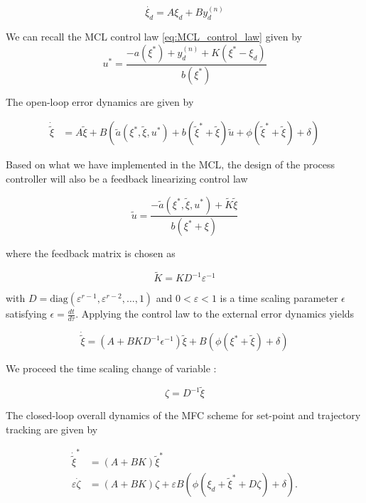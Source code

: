 \begin{equation}
    \dot{\xi_d} = A\xi_d + By_d^{(n)}
\end{equation}

We can recall the MCL control law \ref{eq:MCL_control_law} given by 
\begin{equation}
    u^* = \frac{-a(\xi^*) + y_d^{(n)} + K(\xi^* - \xi_d)}{b(\xi^*)}
\end{equation}

The open-loop error dynamics are given by

\begin{align}
\dot{\tilde{\xi}} &= A\tilde{\xi} + B\left(\tilde{a}(\xi^*, \tilde{\xi}, u^*) + b(\tilde{\xi}^* + \tilde{\xi}) \tilde{u} + \phi(\tilde{\xi}^* + \tilde{\xi}) + \delta\right)
\end{align}


Based on what we have implemented in the MCL, the design of the process controller will also be a feedback linearizing control law 

\begin{equation}
\tilde{u} = \frac{-\tilde{a}(\xi^*, \tilde{\xi}, u^*) + \tilde{K}\tilde{\xi}}{b(\xi^* + \xi)}
\end{equation}

where the feedback matrix is chosen as

\begin{equation}
\tilde{K} = KD^{-1}\varepsilon^{-1}
\end{equation}

with \(D = \text{diag}(\varepsilon^{r-1}, \varepsilon^{r-2}, \ldots, 1)\) and \(0 < \varepsilon < 1\) is a time scaling parameter \(\epsilon\) satisfying \(\epsilon=\frac{dt}{d\tau}\). Applying the control law to the external error dynamics yields

\begin{equation}
\dot{\tilde{\xi}} = (A + BKD^{-1}\epsilon^{-1})\tilde{\xi} + B(\phi(\xi^* + \tilde{\xi}) + \delta)
\end{equation}

We proceed the time scaling change of variable : 

\begin{equation}
    \zeta = D^{-1}\tilde{\xi}
\end{equation}

The closed-loop overall dynamics of the MFC scheme for set-point and trajectory tracking are given by

\begin{align}
\label{eq:The closed-loop overall dynamics of the MFC}
\dot{\tilde{\xi}}^* &= (A + BK)\tilde{\xi}^* \\
\varepsilon\dot{\zeta} &= (A + BK)\zeta + \varepsilon B \left(\phi(\xi_d + \tilde{\xi}^* + D\zeta) + \delta\right).
\end{align}

